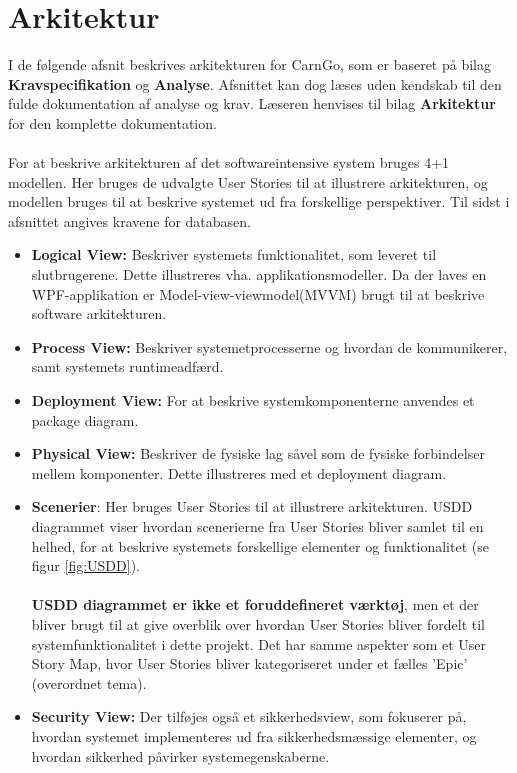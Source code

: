 \documentclass[Rapport/Rapport_main.tex]{subfiles}
\begin{document}
\section{Arkitektur}
I de følgende afsnit beskrives arkitekturen for CarnGo, som er baseret på bilag \textbf{Kravspecifikation} og \textbf{Analyse}. Afsnittet kan dog læses uden kendskab til den fulde dokumentation af analyse og krav. Læseren henvises til bilag \textbf{Arkitektur} for den komplette dokumentation.\\\\
For at beskrive arkitekturen af det softwareintensive system bruges 4+1 modellen. Her bruges de udvalgte User Stories til at illustrere arkitekturen, og modellen bruges til at beskrive systemet ud fra forskellige perspektiver. Til sidst i afsnittet angives kravene for databasen.  
\begin{itemize}
    \item \textbf{Logical View:} Beskriver systemets funktionalitet, som leveret til slutbrugerene. Dette illustreres vha. applikationsmodeller. Da der laves en WPF-applikation er Model-view-viewmodel(MVVM) brugt til at beskrive software arkitekturen. 
    \item \textbf{Process View:} Beskriver systemetprocesserne og hvordan de kommunikerer, samt systemets runtimeadfærd.
    \item \textbf{Deployment View:} For at beskrive systemkomponenterne anvendes et package diagram. 
    \item \textbf{Physical View:} Beskriver de fysiske lag såvel som de fysiske forbindelser mellem komponenter. Dette illustreres med et deployment diagram. 
    \item \textbf{Scenerier}: Her bruges User Stories til at illustrere arkitekturen. USDD diagrammet viser hvordan scenerierne fra User Stories bliver samlet til en helhed, for at beskrive systemets forskellige elementer og funktionalitet (se figur \ref{fig:USDD}). \\\\
    \textbf{USDD diagrammet er ikke et foruddefineret værktøj}, men et der bliver brugt til at give overblik over hvordan User Stories bliver fordelt til systemfunktionalitet i dette projekt. Det har samme aspekter som et User Story Map, hvor User Stories bliver kategoriseret under et fælles 'Epic' (overordnet tema).
    \item \textbf{Security View:} Der tilføjes også et sikkerhedsview, som fokuserer på, hvordan systemet implementeres ud fra sikkerhedsmæssige elementer, og hvordan sikkerhed påvirker systemegenskaberne. 
\end{itemize} \newpage 
\end{document}
